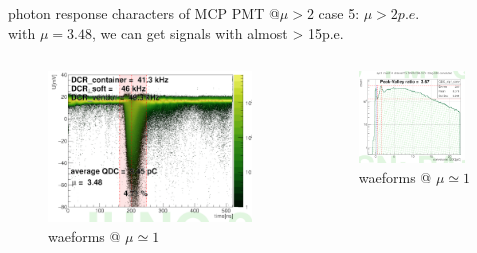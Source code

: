 \documentclass[11pt,compress,xcolor=x11names,UTF8]{beamer}
\begin{document}
\begin{frame}{photon response characters of MCP PMT @$\mu >2$ }
	case 5: $\mu >2p.e.$\\
with $\mu=3.48$,  we can get signals with almost > 15p.e. 
\begin{columns}
\begin{column}{.495\textwidth}
\begin{figure}
\centering
\includegraphics[width=0.97\textwidth]{figure/mpewave.png} %
\caption{waeforms @ $\mu\simeq  1$}
\end{figure}
\end{column}
\begin{column}{.475\textwidth}
\begin{figure}
\centering
\includegraphics[width=0.94\textwidth]{figure/mpeqdc.png} %
\caption{waeforms @ $\mu\simeq  1$}
\end{figure}
\end{column}
\end{columns}
\end{frame}
\end{document}
